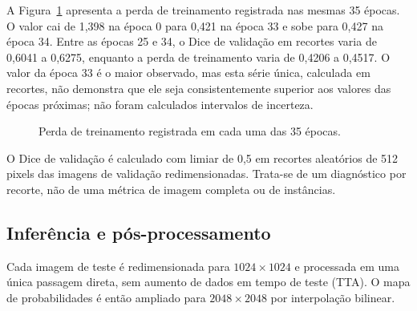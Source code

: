 \documentclass[
  article,
  11pt,
  oneside,
  a4paper,
  english,
  brazil,
  sumario=tradicional
]{abntex2}
\begin{document}
A Figura~\ref{fig:train-loss} apresenta a perda de treinamento registrada nas mesmas 35 épocas. O valor cai de 1,398 na época 0 para 0,421 na época 33 e sobe para 0,427 na época 34. Entre as épocas 25 e 34, o Dice de validação em recortes varia de 0,6041 a 0,6275, enquanto a perda de treinamento varia de 0,4206 a 0,4517. O valor da época 33 é o maior observado, mas esta série única, calculada em recortes, não demonstra que ele seja consistentemente superior aos valores das épocas próximas; não foram calculados intervalos de incerteza.

\begin{figure}[htbp]
\centering
{}
\caption{Perda de treinamento registrada em cada uma das 35 épocas.}
\label{fig:train-loss}
\par{}
\end{figure}

O Dice de validação é calculado com limiar de 0,5 em recortes aleatórios de 512 pixels das imagens de validação redimensionadas. Trata-se de um diagnóstico por recorte, não de uma métrica de imagem completa ou de instâncias.

\subsection{Inferência e pós-processamento}

Cada imagem de teste é redimensionada para $1024\times1024$ e processada em uma única passagem direta, sem aumento de dados em tempo de teste (TTA). O mapa de probabilidades é então ampliado para $2048\times2048$ por interpolação bilinear.
\end{document}
